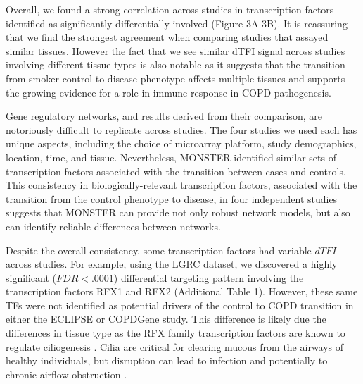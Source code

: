 Overall, we found a strong correlation across studies in transcription factors identified as significantly differentially involved (Figure 3A-3B). It is reassuring that we find the strongest agreement when comparing studies that assayed similar tissues. However the fact that we see similar dTFI signal across studies involving different tissue types is also notable as it suggests that the transition from smoker control to disease phenotype affects multiple tissues and supports the growing evidence for a role in immune response in COPD pathogenesis.

Gene regulatory networks, and results derived from their comparison, are notoriously difficult to replicate across studies\cite{sirbu2010comparison}. The four studies we used each has unique aspects, including the choice of microarray platform, study demographics, location, time, and tissue. Nevertheless, MONSTER  identified similar sets of transcription factors associated with the transition between cases and controls. This consistency in  biologically-relevant transcription factors, associated with the transition from the control phenotype to disease, in four independent studies suggests that MONSTER can provide not only robust network models, but also can identify reliable differences between networks.

Despite the overall consistency, some transcription factors had variable $dTFI$ across studies. For example, using the LGRC dataset, we discovered a highly significant ($FDR<.0001$) differential targeting pattern involving the transcription factors RFX1 and RFX2 (Additional Table 1). However, these same TFs were not identified as potential drivers of the control to COPD transition in either the ECLIPSE or COPDGene study. This difference is likely due the differences in tissue type as the RFX family transcription factors are known to regulate ciliogenesis \cite{choksi2014switching}. Cilia are critical for clearing mucous from the airways of healthy individuals, but disruption  can lead to infection and potentially to chronic airflow obstruction \cite{hessel2014intraflagellar, hogg2004pathophysiology, fahy2010airway}. 

